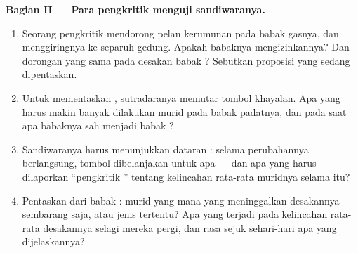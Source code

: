 \begin{problem}
\medskip\noindent\textbf{Bagian II --- Para pengkritik menguji
sandiwaranya.}
\begin{enumerate}[resume]
  \item Seorang pengkritik mendorong pelan kerumunan pada babak
        gasnya, dan menggiringnya ke separuh gedung. Apakah babaknya
        mengizinkannya? Dan dorongan yang sama pada desakan babak ? Sebutkan proposisi yang sedang dipentaskan.
  \item Untuk mementaskan \emph{}, sutradaranya memutar
        tombol  khayalan. Apa yang harus makin banyak dilakukan
        murid pada babak padatnya, dan pada saat apa babaknya sah
        menjadi babak ?
  \item Sandiwaranya harus menunjukkan dataran : selama
        perubahannya berlangsung,  tombol  dibelanjakan
        untuk apa --- dan apa yang harus dilaporkan ``pengkritik
        '' tentang kelincahan rata-rata muridnya selama
        itu?
  \item Pentaskan  dari babak : murid yang mana
        yang meninggalkan desakannya --- sembarang saja, atau jenis
        tertentu? Apa yang terjadi pada kelincahan rata-rata
        desakannya selagi mereka pergi, dan rasa sejuk sehari-hari
        apa yang dijelaskannya?
\end{enumerate}


\end{problem}
